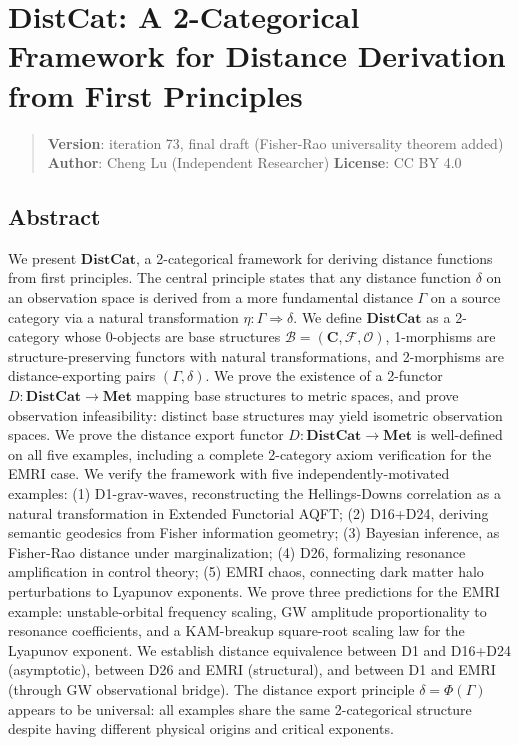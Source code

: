 \documentclass[
]{article}
\author{}
\date{}
\begin{document}
\section{DistCat: A 2-Categorical Framework for Distance Derivation from
First
Principles}\label{distcat-a-2-categorical-framework-for-distance-derivation-from-first-principles}

\begin{quote}
\textbf{Version}: iteration 73, final draft (Fisher-Rao universality
theorem added) \textbf{Author}: Cheng Lu (Independent Researcher)
\textbf{License}: CC BY 4.0
\end{quote}

\subsection{Abstract}\label{abstract}

We present \(\mathbf{DistCat}\), a 2-categorical framework for deriving
distance functions from first principles. The central principle states
that any distance function \(\delta\) on an observation space is derived
from a more fundamental distance \(\Gamma\) on a source category via a
natural transformation \(\eta: \Gamma \Rightarrow \delta\). We define
\(\mathbf{DistCat}\) as a 2-category whose 0-objects are base structures
\(\mathcal{B}=(\mathbf{C},\mathcal{F},\mathcal{O})\), 1-morphisms are
structure-preserving functors with natural transformations, and
2-morphisms are distance-exporting pairs \((\Gamma,\delta)\). We prove
the existence of a 2-functor \(D: \mathbf{DistCat} \to \mathbf{Met}\)
mapping base structures to metric spaces, and prove observation
infeasibility: distinct base structures may yield isometric observation
spaces. We prove the distance export functor
\(D: \mathbf{DistCat} \to \mathbf{Met}\) is well-defined on all five
examples, including a complete 2-category axiom verification for the
EMRI case. We verify the framework with five independently-motivated
examples: (1) D1-grav-waves, reconstructing the Hellings-Downs
correlation as a natural transformation in Extended Functorial AQFT; (2)
D16+D24, deriving semantic geodesics from Fisher information geometry;
(3) Bayesian inference, as Fisher-Rao distance under marginalization;
(4) D26, formalizing resonance amplification in control theory; (5) EMRI
chaos, connecting dark matter halo perturbations to Lyapunov exponents.
We prove three predictions for the EMRI example: unstable-orbital
frequency scaling, GW amplitude proportionality to resonance
coefficients, and a KAM-breakup square-root scaling law for the Lyapunov
exponent. We establish distance equivalence between D1 and D16+D24
(asymptotic), between D26 and EMRI (structural), and between D1 and EMRI
(through GW observational bridge). The distance export principle
\(\delta = \Phi(\Gamma)\) appears to be universal: all examples share
the same 2-categorical structure despite having different physical
origins and critical exponents.
\end{document}

